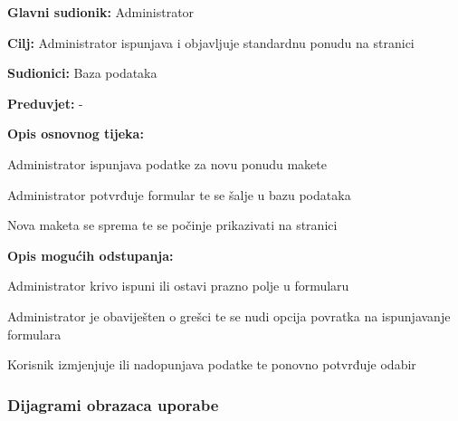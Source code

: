 				\noindent {}
				\begin{packed_item}
					
					\item \textbf{Glavni sudionik: }Administrator
					\item  \textbf{Cilj:} Administrator ispunjava i objavljuje standardnu ponudu na stranici
					\item  \textbf{Sudionici:} Baza podataka
					\item  \textbf{Preduvjet:} -
					\item  \textbf{Opis osnovnog tijeka:}
					
					\item[] \begin{packed_enum}
						
						\item Administrator ispunjava podatke za novu ponudu makete
						\item Administrator potvrđuje formular te se šalje u bazu podataka
						\item Nova maketa se sprema te se počinje prikazivati na stranici
					\end{packed_enum}

					\item  \textbf{Opis mogućih odstupanja:}
					
					\item[] \begin{packed_item}
 
						\item[2.a] Administrator krivo ispuni ili ostavi prazno polje u formularu
						\item[] \begin{packed_enum}
							
							\item Administrator je obaviješten o grešci te se nudi opcija povratka na ispunjavanje formulara
							\item Korisnik izmjenjuje ili nadopunjava podatke te ponovno potvrđuje odabir
							
						\end{packed_enum}	
					\end{packed_item}
				\end{packed_item}
					
				\subsubsection{Dijagrami obrazaca uporabe}
					
